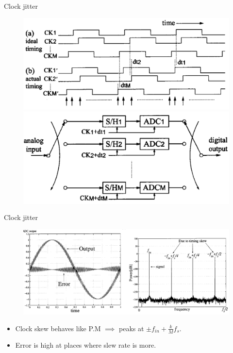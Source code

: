 \documentclass{beamer}
\begin{document}
\begin{frame}{Clock jitter}
\begin{figure}
	\includegraphics[scale=0.2]{./figs/Skew.png}
	\includegraphics[scale=0.2]{./figs/Skewcir.png}
\end{figure}
\end{frame}

\begin{frame}{Clock jitter}
\begin{figure}
	\includegraphics[scale=0.3]{./figs/Skewplot.png}
\end{figure}
\pause
\begin{itemize}
\item Clock skew behaves like P.M $\implies$ peaks at $\pm f_{in} + \frac{k}{M}f_{s}$.
\item Error is high at places where slew rate is more.
\end{itemize}
\end{frame}
\end{document}
